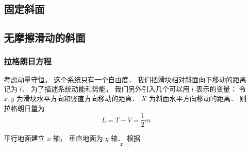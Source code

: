 
\subsection{固定斜面}

\subsection{无摩擦滑动的斜面}

\subsubsection{拉格朗日方程}
考虑动量守恒， 这个系统只有一个自由度． 我们把滑块相对斜面向下移动的距离记为 $l$． 为了描述系统动能和势能， 我们另外引入几个可以用 $l$ 表示的变量： 令 $x, y$ 为滑块水平方向和竖直方向移动的距离． $X$ 为斜面水平方向移动的距离． 则拉格朗日量为
\begin{equation}
L = T - V = \frac12 m 
\end{equation}


平行地面建立 $x$ 轴， 垂直地面为 $y$ 轴． 根据
\begin{equation}
x = 
\end{equation}

